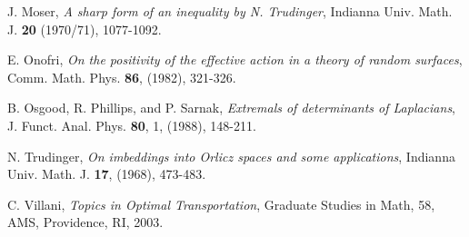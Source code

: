 \documentclass[10pt]{article}
\numberwithin{equation}{section}
\theoremstyle{plain}
\theoremstyle{definition}
\theoremstyle{remark}
\begin{document}
\begin{thebibliography}{999}
 J. Moser, {\em A sharp form of an inequality by N. Trudinger}, Indianna Univ. Math. J. {\bf 20} (1970/71), 1077-1092.

 E. Onofri, {\em On the positivity of the effective action in a theory of random surfaces}, Comm. Math. Phys.  {\bf 86}, (1982), 321-326.

 B. Osgood, R. Phillips, and P. Sarnak, {\em Extremals of determinants of Laplacians}, J. Funct. Anal. Phys. {\bf 80}, 1, (1988), 148-211.

 N. Trudinger, {\em On imbeddings into Orlicz spaces and some applications}, Indianna Univ. Math. J. {\bf 17}, (1968), 473-483.


 C. Villani, {\em Topics in Optimal Transportation}, Graduate Studies in Math, 58, AMS, Providence, RI, 2003.



\end{thebibliography}
\end{document}
